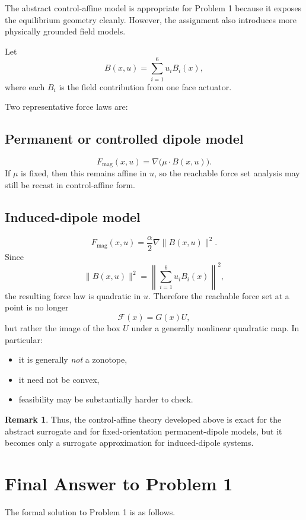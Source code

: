 \documentclass[11pt]{article}
\theoremstyle{definition}
\newtheorem{remark}{Remark}
\begin{document}
The abstract control-affine model is appropriate for Problem 1 because it exposes the equilibrium geometry cleanly. However, the assignment also introduces more physically grounded field models.

Let
\[
B(x,u)=\sum_{i=1}^6 u_i B_i(x),
\]
where each \(B_i\) is the field contribution from one face actuator.

Two representative force laws are:

\subsection*{Permanent or controlled dipole model}
\[
F_{\mathrm{mag}}(x,u)=\nabla\big(\mu \cdot B(x,u)\big).
\]
If \(\mu\) is fixed, then this remains affine in \(u\), so the reachable force set analysis may still be recast in control-affine form.

\subsection*{Induced-dipole model}
\[
F_{\mathrm{mag}}(x,u)=\frac{\alpha}{2}\nabla \|B(x,u)\|^2.
\]
Since
\[
\|B(x,u)\|^2
=
\left\|\sum_{i=1}^6 u_i B_i(x)\right\|^2,
\]
the resulting force law is quadratic in \(u\). Therefore the reachable force set at a point is no longer
\[
\mathcal{F}(x)=G(x)U,
\]
but rather the image of the box \(U\) under a generally nonlinear quadratic map. In particular:
\begin{itemize}[leftmargin=1.5em]
    \item it is generally \emph{not} a zonotope,
    \item it need not be convex,
    \item feasibility may be substantially harder to check.
\end{itemize}

\begin{remark}
Thus, the control-affine theory developed above is exact for the abstract surrogate and for fixed-orientation permanent-dipole models, but it becomes only a surrogate approximation for induced-dipole systems.
\end{remark}

\section{Final Answer to Problem 1}

The formal solution to Problem 1 is as follows.
\end{document}
